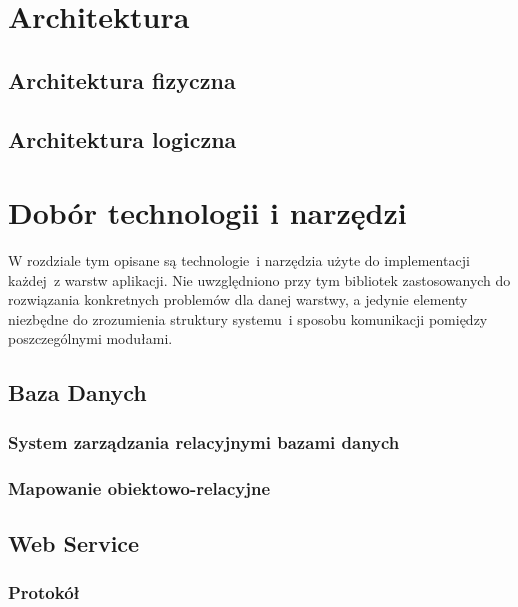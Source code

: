 \documentclass[11pt]{aghdpl}
\begin{document}

\chapter{Architektura}
\label{cha:architektura}

\section{Architektura fizyczna}
\label{sec:architektura_fizyczna}

\section{Architektura logiczna}
\label{sec:architektura_logiczna}


\chapter{Dobór technologii i narzędzi}
\label{cha:dobor_technologii_i_narzedzi}

W rozdziale tym opisane są technologie~i narzędzia użyte do implementacji każdej~z warstw aplikacji. Nie uwzględniono przy tym bibliotek zastosowanych do rozwiązania konkretnych problemów dla danej warstwy, a jedynie elementy niezbędne do zrozumienia struktury systemu~i sposobu komunikacji pomiędzy poszczególnymi modułami.


\section{Baza Danych}
\subsection{System zarządzania relacyjnymi bazami danych}
\subsection{Mapowanie obiektowo-relacyjne}
\section{Web Service}
\subsection{Protokół}
\end{document}
